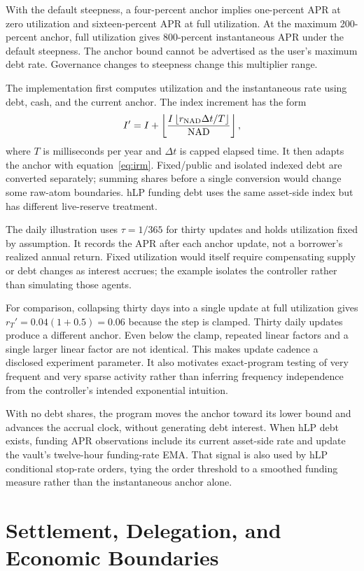 With the default steepness, a four-percent anchor implies one-percent APR at zero utilization and sixteen-percent APR at full utilization. At the maximum 200-percent anchor, full utilization gives 800-percent instantaneous APR under the default steepness. The anchor bound cannot be advertised as the user's maximum debt rate. Governance changes to steepness change this multiplier range.

The implementation first computes utilization and the instantaneous rate using debt, cash, and the current anchor. The index increment has the form
\[
I'=I+\left\lfloor\frac{I\left\lfloor r_{\rm NAD}\Delta t/T\right\rfloor}{\mathrm{NAD}}\right\rfloor,
\]
where $T$ is milliseconds per year and $\Delta t$ is capped elapsed time. It then adapts the anchor with equation~\eqref{eq:irm}. Fixed/public and isolated indexed debt are converted separately; summing shares before a single conversion would change some raw-atom boundaries. hLP funding debt uses the same asset-side index but has different live-reserve treatment.

The daily illustration uses $\tau=1/365$ for thirty updates and holds utilization fixed by assumption. It records the APR after each anchor update, not a borrower's realized annual return. Fixed utilization would itself require compensating supply or debt changes as interest accrues; the example isolates the controller rather than simulating those agents.

For comparison, collapsing thirty days into a single update at full utilization gives $r_T'=0.04(1+0.5)=0.06$ because the step is clamped. Thirty daily updates produce a different anchor. Even below the clamp, repeated linear factors and a single larger linear factor are not identical. This makes update cadence a disclosed experiment parameter. It also motivates exact-program testing of very frequent and very sparse activity rather than inferring frequency independence from the controller's intended exponential intuition.

With no debt shares, the program moves the anchor toward its lower bound and advances the accrual clock, without generating debt interest. When hLP debt exists, funding APR observations include its current asset-side rate and update the vault's twelve-hour funding-rate EMA. That signal is also used by hLP conditional stop-rate orders, tying the order threshold to a smoothed funding measure rather than the instantaneous anchor alone.

\section{Settlement, Delegation, and Economic Boundaries}

